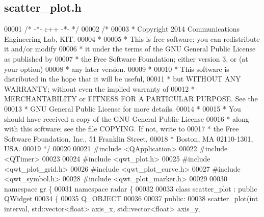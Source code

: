 \subsection{scatter\+\_\+plot.\+h}
\label{scatter__plot_8h_source}

\begin{DoxyCode}
00001 \textcolor{comment}{/* -*- c++ -*- */}
00002 \textcolor{comment}{/* }
00003 \textcolor{comment}{ * Copyright 2014 Communications Engineering Lab, KIT.}
00004 \textcolor{comment}{ * }
00005 \textcolor{comment}{ * This is free software; you can redistribute it and/or modify}
00006 \textcolor{comment}{ * it under the terms of the GNU General Public License as published by}
00007 \textcolor{comment}{ * the Free Software Foundation; either version 3, or (at your option)}
00008 \textcolor{comment}{ * any later version.}
00009 \textcolor{comment}{ * }
00010 \textcolor{comment}{ * This software is distributed in the hope that it will be useful,}
00011 \textcolor{comment}{ * but WITHOUT ANY WARRANTY; without even the implied warranty of}
00012 \textcolor{comment}{ * MERCHANTABILITY or FITNESS FOR A PARTICULAR PURPOSE.  See the}
00013 \textcolor{comment}{ * GNU General Public License for more details.}
00014 \textcolor{comment}{ * }
00015 \textcolor{comment}{ * You should have received a copy of the GNU General Public License}
00016 \textcolor{comment}{ * along with this software; see the file COPYING.  If not, write to}
00017 \textcolor{comment}{ * the Free Software Foundation, Inc., 51 Franklin Street,}
00018 \textcolor{comment}{ * Boston, MA 02110-1301, USA.}
00019 \textcolor{comment}{ */}
00020 
00021 \textcolor{preprocessor}{#include <QApplication>}
00022 \textcolor{preprocessor}{#include <QTimer>}
00023 
00024 \textcolor{preprocessor}{#include <qwt\_plot.h>}
00025 \textcolor{preprocessor}{#include <qwt\_plot\_grid.h>}
00026 \textcolor{preprocessor}{#include <qwt\_plot\_curve.h>}
00027 \textcolor{preprocessor}{#include <qwt\_symbol.h>}
00028 \textcolor{preprocessor}{#include <qwt\_plot\_marker.h>}
00029 
00030 \textcolor{keyword}{namespace }gr \{
00031     \textcolor{keyword}{namespace }radar \{
00032         
00033         \textcolor{keyword}{class }scatter_plot : \textcolor{keyword}{public} QWidget
00034         \{
00035         Q\_OBJECT
00036 
00037         \textcolor{keyword}{public}:
00038             scatter_plot(\textcolor{keywordtype}{int} interval, std::vector<float> axis\_x, std::vector<float> axis\_y, 

\end{DoxyCode}

